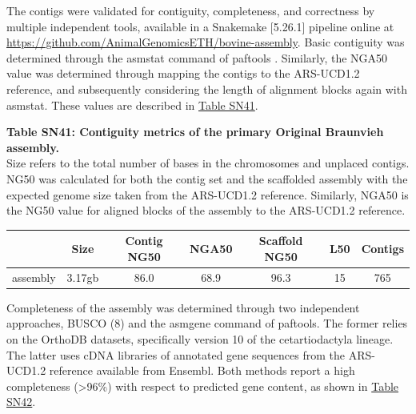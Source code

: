 \documentclass[../main.tex]{subfiles}
\begin{document}
\begin{flushleft}
\bigskip

The contigs were validated for contiguity, completeness, and correctness by multiple independent tools, available in a Snakemake [5.26.1] \citep{koster2012snakemake} pipeline online at \url{https://github.com/AnimalGenomicsETH/bovine-assembly}. Basic contiguity was determined through the asmstat command of paftools \citep{li2018minimap2}. Similarly, the NGA50 value was determined through mapping the contigs to the ARS-UCD1.2 reference, and subsequently considering the length of alignment blocks again with asmstat. These values are described in \hyperlink{Table SN41}{Table SN41}.

\bigskip

\textbf{\hypertarget{Table SN41}{Table SN41}: Contiguity metrics of the primary Original Braunvieh assembly.} \\
\footnotesize{Size refers to the total number of bases in the chromosomes and unplaced contigs. NG50 was calculated for both the contig set and the scaffolded assembly with the expected genome size taken from the ARS-UCD1.2 reference. Similarly, NGA50 is the NG50 value for aligned blocks of the assembly to the ARS-UCD1.2 reference.}
\begin{center}
    \begin{tabular}{|c|c|c|c|c|c|c|}
    \hline
    ~        & Size   & Contig NG50 & NGA50 & Scaffold NG50 & L50 & Contigs  \\
    \hline
    assembly & 3.17gb & 86.0        & 68.9  & 96.3          & 15  & 765      \\
    \hline
    \end{tabular}
\end{center}

\normalsize

Completeness of the assembly was determined through two independent approaches, BUSCO (8) and the asmgene command of paftools. The former relies on the OrthoDB datasets, specifically version 10 of the cetartiodactyla lineage. The latter uses cDNA libraries of annotated gene sequences from the ARS-UCD1.2 reference available from Ensembl. Both methods report a high completeness (>96\%) with respect to predicted gene content, as shown in \hyperlink{Table SN42}{Table SN42}.

\newpage


\end{flushleft}
\end{document}
